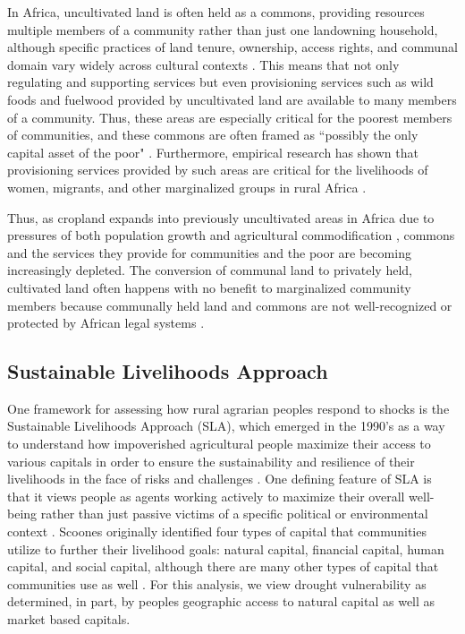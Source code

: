 \documentclass{article}
\begin{document}
In Africa, uncultivated land is often held as a commons, providing resources multiple members of a community rather than just one landowning household, although specific practices of land tenure, ownership, access rights, and communal domain vary widely across cultural contexts \cite{Wily2008}.  This means that not only regulating and supporting services but even provisioning services such as wild foods and fuelwood provided by uncultivated land are available to many members of a community.  Thus, these areas are especially critical for the poorest members of communities, and these commons are often framed as ``possibly the only capital asset of the poor" \cite{Wily2008}.  Furthermore, empirical research has shown that provisioning services provided by such areas are critical for the livelihoods of women, migrants, and other marginalized groups in rural Africa \cite{Coulibaly-Lingani2009, Pouliot2013}.

Thus, as cropland expands into previously uncultivated areas in Africa due to pressures of both population growth and agricultural commodification \cite{Rudel2013, Laurance2014}, commons and the services they provide for communities and the poor are becoming increasingly depleted.  The conversion of communal land to privately held, cultivated land often happens with no benefit to marginalized community members because communally held land and commons are not well-recognized or protected by African legal systems \cite{Wily2011}.

\subsection{Sustainable Livelihoods Approach}
One framework for assessing how rural agrarian peoples respond to shocks is the Sustainable Livelihoods Approach (SLA), which emerged in the 1990's as a way to understand how impoverished agricultural people maximize their access to various capitals in order to ensure the sustainability and resilience of their livelihoods in the face of risks and challenges \cite{Scoones1998a, Ellis1998, Bebbington1999}.  One defining feature of SLA is that it views people as agents working actively to maximize their overall well-being rather than just passive victims of a specific political or environmental context \cite{Adato2002}.  Scoones originally identified four types of capital that communities utilize to further their livelihood goals: natural capital, financial capital, human capital, and social capital, although there are many other types of capital that communities use as well \cite{Scoones1998a}.  For this analysis, we view drought vulnerability as determined, in part, by peoples geographic access to natural capital as well as market based capitals.
\end{document}
